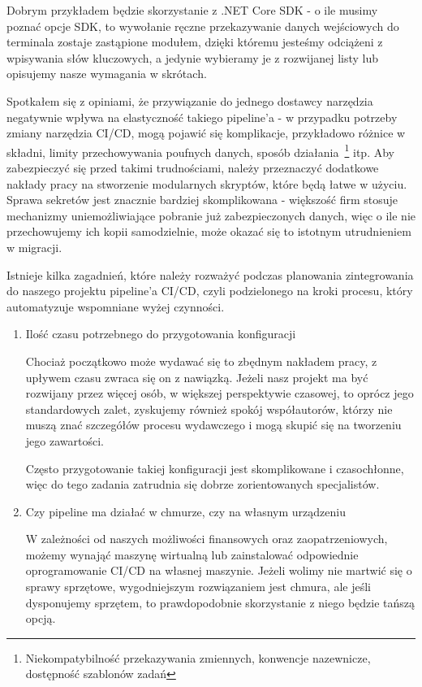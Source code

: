 Dobrym przykładem będzie skorzystanie z .NET Core SDK - o ile musimy poznać opcje SDK,
to wywołanie ręczne przekazywanie danych wejściowych do terminala zostaje zastąpione 
modułem, dzięki któremu jesteśmy odciążeni z wpisywania słów kluczowych, a jedynie wybieramy je z rozwijanej listy 
lub opisujemy nasze wymagania w skrótach. 

Spotkałem się z opiniami, że przywiązanie do jednego dostawcy narzędzia negatywnie wpływa na elastyczność 
takiego pipeline'a - w przypadku potrzeby zmiany narzędzia CI/CD, mogą pojawić się komplikacje, 
przykładowo różnice w składni, limity przechowywania poufnych danych, sposób działania~\footnote[2]{
    Niekompatybilność przekazywania zmiennych, konwencje nazewnicze, dostępność szablonów zadań
} itp.
Aby zabezpieczyć się przed takimi trudnościami, należy przeznaczyć dodatkowe nakłady pracy na stworzenie 
modularnych skryptów, które będą łatwe w użyciu.
Sprawa sekretów jest znacznie bardziej skomplikowana - większość firm stosuje mechanizmy uniemożliwiające pobranie już 
zabezpieczonych danych, więc o ile nie przechowujemy ich kopii samodzielnie, może okazać się to istotnym utrudnieniem w migracji.

Istnieje kilka zagadnień, które należy rozważyć podczas planowania zintegrowania do naszego projektu pipeline'a CI/CD,
czyli podzielonego na kroki procesu, który automatyzuje wspomniane wyżej czynności.
\begin{enumerate}
    \item Ilość czasu potrzebnego do przygotowania konfiguracji

    Chociaż początkowo może wydawać się to zbędnym nakładem pracy, z upływem czasu zwraca się on z nawiązką.
    Jeżeli nasz projekt ma być rozwijany przez więcej osób, w większej perspektywie czasowej, 
    to oprócz jego standardowych zalet, zyskujemy również spokój współautorów, 
    którzy nie muszą znać szczegółów procesu wydawczego i mogą skupić się na tworzeniu jego zawartości.

    Często przygotowanie takiej konfiguracji jest skomplikowane i czasochłonne, 
    więc do tego zadania zatrudnia się dobrze zorientowanych specjalistów.

    \item Czy pipeline ma działać w chmurze, czy na własnym urządzeniu

    W zależności od naszych możliwości finansowych oraz zaopatrzeniowych, możemy wynająć maszynę wirtualną
    lub zainstalować odpowiednie oprogramowanie CI/CD na własnej maszynie. 
    Jeżeli wolimy nie martwić się o sprawy sprzętowe, wygodniejszym rozwiązaniem jest chmura,
    ale jeśli dysponujemy sprzętem, to prawdopodobnie skorzystanie z niego będzie tańszą opcją. 
\end{enumerate}


